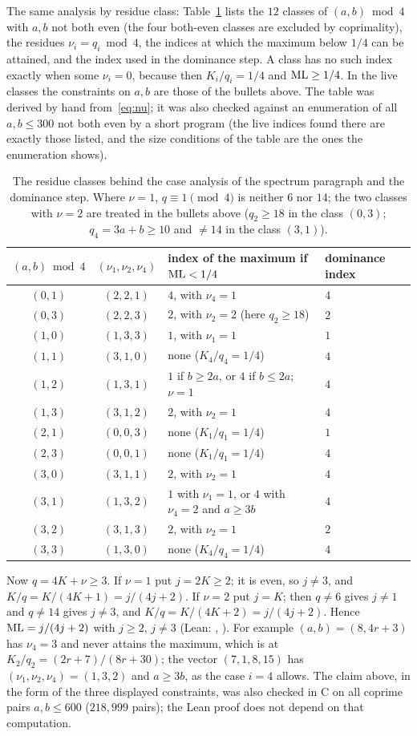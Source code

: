 \documentclass[11pt]{article}
\theoremstyle{remark}
\newcommand{\lean}[1]{{\small\texttt{\detokenize{#1}}}}
\begin{document}
The same analysis by residue class: Table~\ref{tab:nu} lists the $12$ classes of $(a,b)\bmod4$ with $a,b$ not both even (the four both-even classes are excluded by coprimality), the residues $\nu_i=q_i\bmod4$, the indices at which the maximum below $1/4$ can be attained, and the index used in the dominance step. A class has no such index exactly when some $\nu_i=0$, because then $K_i/q_i=1/4$ and $\mathrm{ML}\ge1/4$. In the live classes the constraints on $a,b$ are those of the bullets above. The table was derived by hand from~\eqref{eq:nu}; it was also checked against an enumeration of all $a,b\le300$ not both even by a short program (the live indices found there are exactly those listed, and the size conditions of the table are the ones the enumeration shows).
\begin{table}[ht]
\centering\small
\begin{tabular}{ccll}
\toprule
$(a,b)\bmod4$ & $(\nu_1,\nu_2,\nu_4)$ & index of the maximum if $\mathrm{ML}<1/4$ & dominance index\\
\midrule
$(0,1)$ & $(2,2,1)$ & $4$, with $\nu_4=1$ & $4$\\
$(0,3)$ & $(2,2,3)$ & $2$, with $\nu_2=2$ (here $q_2\ge18$) & $2$\\
$(1,0)$ & $(1,3,3)$ & $1$, with $\nu_1=1$ & $1$\\
$(1,1)$ & $(3,1,0)$ & none ($K_4/q_4=1/4$) & $4$\\
$(1,2)$ & $(1,3,1)$ & $1$ if $b\ge2a$, or $4$ if $b\le2a$; $\nu=1$ & $4$\\
$(1,3)$ & $(3,1,2)$ & $2$, with $\nu_2=1$ & $4$\\
$(2,1)$ & $(0,0,3)$ & none ($K_1/q_1=1/4$) & $1$\\
$(2,3)$ & $(0,0,1)$ & none ($K_1/q_1=1/4$) & $4$\\
$(3,0)$ & $(3,1,1)$ & $2$, with $\nu_2=1$ & $4$\\
$(3,1)$ & $(1,3,2)$ & $1$ with $\nu_1=1$, or $4$ with $\nu_4=2$ and $a\ge3b$ & $4$\\
$(3,2)$ & $(3,1,3)$ & $2$, with $\nu_2=1$ & $2$\\
$(3,3)$ & $(1,3,0)$ & none ($K_4/q_4=1/4$) & $4$\\
\bottomrule
\end{tabular}
\caption{The residue classes behind the case analysis of the spectrum paragraph and the dominance step. Where $\nu=1$, $q\equiv1\pmod 4$ is neither $6$ nor $14$; the two classes with $\nu=2$ are treated in the bullets above ($q_2\ge18$ in the class $(0,3)$; $q_4=3a+b\ge10$ and $\ne14$ in the class $(3,1)$).}
\label{tab:nu}
\end{table}
Now $q=4K+\nu\ge3$. If $\nu=1$ put $j=2K\ge2$; it is even, so $j\ne3$, and $K/q=K/(4K+1)=j/(4j+2)$. If $\nu=2$ put $j=K$; then $q\ne6$ gives $j\ne1$ and $q\ne14$ gives $j\ne3$, and $K/q=K/(4K+2)=j/(4j+2)$. Hence $\mathrm{ML}=j/(4j+2)$ with $j\ge2$, $j\ne3$ (Lean: \lean{U2_spectrum}, \lean{fin_step}). For example $(a,b)=(8,4r+3)$ has $\nu_4=3$ and never attains the maximum, which is at $K_2/q_2=(2r+7)/(8r+30)$; the vector $(7,1,8,15)$ has $(\nu_1,\nu_2,\nu_4)=(1,3,2)$ and $a\ge3b$, as the case $i=4$ allows. The claim above, in the form of the three displayed constraints, was also checked in C on all coprime pairs $a,b\le600$ ($218{,}999$ pairs); the Lean proof does not depend on that computation.
\end{document}
